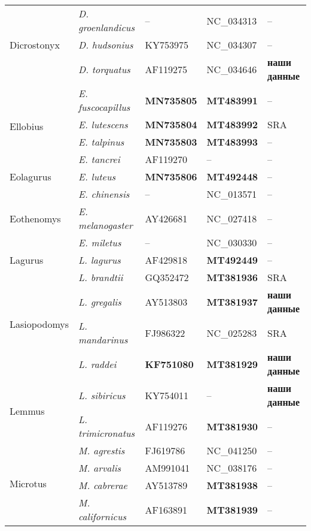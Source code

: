 \begin{landscape}
\begin{center}
\begin{longtable}{|p{3.5cm}|p{4.5cm}|p{4.0cm}|p{6.5cm}|p{4.5cm}|}
\multirow{3}{*}{Dicrostonyx} & \textit{D. groenlandicus} & -- & NC\_034313 & --\\ \cline{2-5}
& \textit{D. hudsonius} & KY753975 & NC\_034307 & --\\ \cline{2-5}
& \textit{D. torquatus} & AF119275 & NC\_034646 & \textbf{наши данные}\\ \hline
\multirow{4}{*}{Ellobius} & \textit{E. fuscocapillus} & \textbf{MN735805} & \textbf{MT483991} & --\\ \cline{2-5}
& \textit{E. lutescens} & \textbf{MN735804} & \textbf{MT483992} & SRA\\ \cline{2-5}
& \textit{E. talpinus} & \textbf{MN735803} & \textbf{MT483993} & --\\ \cline{2-5}
& \textit{E. tancrei} & AF119270 & -- & --\\ \hline
Eolagurus & \textit{E. luteus} & \textbf{MN735806} & \textbf{MT492448} & --\\ \hline
\multirow{3}{*}{Eothenomys} & \textit{E. chinensis} & -- & NC\_013571 & --\\ \cline{2-5}
& \textit{E. melanogaster} & AY426681 & NC\_027418 & --\\ \cline{2-5}
& \textit{E. miletus} & -- & NC\_030330 & --\\ \hline
Lagurus & \textit{L. lagurus} & AF429818 & \textbf{MT492449} & --\\ \hline
\multirow{4}{*}{Lasiopodomys} & \textit{L. brandtii} & GQ352472 & \textbf{MT381936} & SRA\\ \cline{2-5}
& \textit{L. gregalis} & AY513803 & \textbf{MT381937} & \textbf{наши данные}\\ \cline{2-5}
& \textit{L. mandarinus} & FJ986322 & NC\_025283 & SRA\\ \cline{2-5}
& \textit{L. raddei} & \textbf{KF751080} & \textbf{MT381929} & \textbf{наши данные}\\ \hline
\multirow{2}{*}{Lemmus} & \textit{L. sibiricus} & KY754011 & -- & \textbf{наши данные}\\ \cline{2-5}
& \textit{L. trimicronatus} & AF119276 & \textbf{MT381930} & --\\ \hline
\multirow{14}{*}{Microtus} & \textit{M. agrestis}  & FJ619786 & NC\_041250 & --\\ \cline{2-5}
& \textit{M. arvalis} & AM991041 & NC\_038176 & --\\ \cline{2-5}
& \textit{M. cabrerae} & AY513789 & \textbf{MT381938} & --\\ \cline{2-5}
& \textit{M. californicus} & AF163891 & \textbf{MT381939} & --\\ \cline{2-5}

\end{longtable}
\end{center}
\end{landscape}
